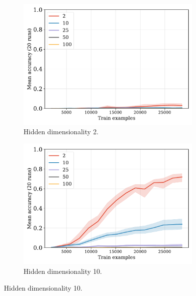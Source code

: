 \documentclass[12pt]{article}
\begin{document}
\begin{figure}[H]
  \centering

  \begin{subfigure}{0.45\linewidth}
    \includegraphics[width=1\textwidth]{fig/fuzzy-lm-vocab20-train_size-embed_dim-hidden_dim=2.pdf}
    \caption{Hidden dimensionality 2.}
  \end{subfigure}
  \hfill
  \begin{subfigure}{0.45\linewidth}
    \includegraphics[width=1\textwidth]{fig/fuzzy-lm-vocab20-train_size-embed_dim-hidden_dim=10.pdf}
    \caption{Hidden dimensionality 10.}
  \end{subfigure}


\end{figure}
\end{document}
